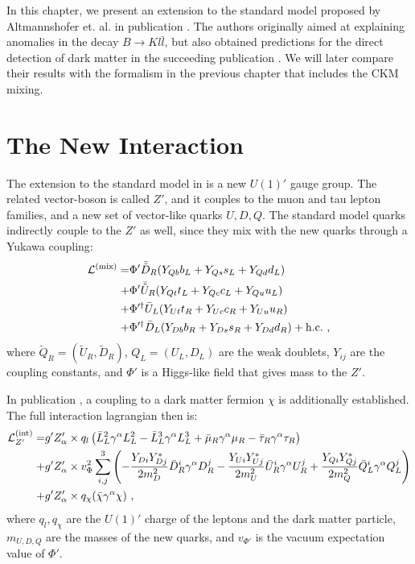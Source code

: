 In this chapter, we present an extension to the standard model proposed by Altmannshofer et. al. in publication \cite{InColour}. The authors originally aimed at explaining anomalies in the decay $B\rightarrow Kl\bar{l}$, but also obtained predictions for the direct detection of dark matter in the succeeding publication \cite{Z}. We will later compare their results with the formalism in the previous chapter that includes the CKM mixing.

\section{The New Interaction}
The extension to the standard model in \cite{InColour} is a new $U(1)'$ gauge group. The related vector-boson is called $Z'$, and it couples to the muon and tau lepton families, and a new set of vector-like quarks $U,D,Q$. The standard model quarks indirectly couple to the $Z'$ as well, since they mix with the new quarks through a Yukawa coupling:
\begin{align}
	\mathcal{L}^{(\text{mix})} = &\Phi' \bar{\tilde{D}}_R(Y_{Qb}b_L + Y_{Qs}s_L + Y_{Qd}d_L)\notag \\
	+ &\Phi'\bar{\tilde{U}}_R(Y_{Qt}t_L + Y_{Qc}c_L + Y_{Qu}u_L)\notag \\
	+ &\Phi'^\dagger\bar{U}_L(Y_{Ut}t_R + Y_{Uc}c_R + Y_{Uu}u_R)\notag \\
	+ &\Phi'^\dagger\bar{D}_L(Y_{Db}b_R + Y_{Ds}s_R + Y_{Dd}d_R) +\text{h.c.} \ ,
\end{align}
where $\tilde{Q}_R = (\tilde{U}_R,\tilde{D}_R)$, $Q_L = (U_L,D_L)$ are the weak doublets, $Y_{ij}$ are the coupling constants, and $\Phi'$ is a Higgs-like field that gives mass to the $Z'$.


In publication \cite{Z}, a coupling to a dark matter fermion $\chi$ is additionally established. The full interaction lagrangian then is:
\begin{align}
	\mathcal{L}^{(\text{int})}_{Z'} = &g'Z_\alpha'\times q_l\left(\bar{L}_L^2\gamma^\alpha L_L^2 - \bar{L}_L^3\gamma^\alpha L_L^3 + \bar{\mu}_R\gamma^\alpha\mu_R-\bar{\tau}_R\gamma^\alpha\tau_R\right)\notag \\
	+&g'Z_\alpha'\times v_\Phi^2\sum_{i,j}^3\left(-\frac{Y_{Di}Y^*_{Dj}}{2m_D^2}\bar{D}_R^i\gamma^\alpha D_R^j - \frac{Y_{Ui}Y^*_{Uj}}{2m_U^2}\bar{U}_R^i\gamma^\alpha U_R^j + \frac{Y_{Qi}Y_{Qj}^*}{2m_Q^2}\bar{Q}_L^i\gamma^\alpha Q_L^j\right)\notag \\
	+&g'Z_\alpha'\times q_\chi(\bar{\chi}\gamma^\alpha\chi) \ ,
\end{align}
where $q_l,q_\chi$ are the $U(1)'$ charge of the leptons and the dark matter particle, $m_{U,D,Q}$ are the masses of the new quarks, and $v_{\Phi'}$ is the vacuum expectation value of $\Phi'$.


